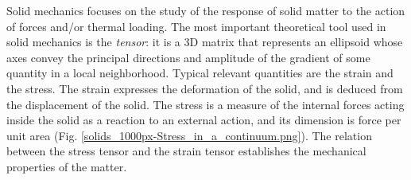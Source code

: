 Solid mechanics focuses on the study of the response of solid matter to the action of forces and/or thermal loading. The most important theoretical tool used in solid mechanics is the \textit{tensor}: it is a 3D matrix that represents an ellipsoid whose axes convey the principal directions and amplitude of the gradient of some quantity in a local neighborhood. Typical relevant quantities are the strain and the stress. The strain expresses the deformation of the solid, and is deduced from the displacement of the solid. The stress is a measure of the internal forces acting inside the solid as a reaction to an external action, and its dimension is force per unit area (Fig. \ref{solids_1000px-Stress_in_a_continuum.png}). The relation between the stress tensor and the strain tensor establishes the mechanical properties of the matter.

